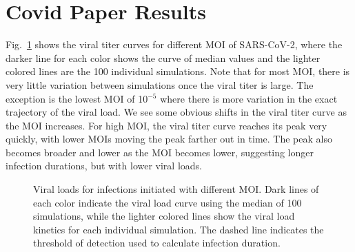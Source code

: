 \section{Covid Paper Results}

Fig.\ \ref{curves} shows the viral titer curves for different MOI of SARS-CoV-2, where the darker line for each color shows the curve of median values and the lighter colored lines are the 100 individual simulations. Note that for most MOI, there is very little variation between simulations once the viral titer is large. The exception is the lowest MOI of 10$^{-5}$ where there is more variation in the exact trajectory of the viral load. We see some obvious shifts in the viral titer curve as the MOI increases. For high MOI, the viral titer curve reaches its peak very quickly, with lower MOIs moving the peak farther out in time. The peak also becomes broader and lower as the MOI becomes lower, suggesting longer infection durations, but with lower viral loads.
\begin{figure}[!h]
\begin{center}
\caption{Viral loads for infections initiated with different MOI. Dark lines of each color indicate the viral load curve using the median of 100 simulations, while the lighter colored lines show the viral load kinetics for each individual simulation. The dashed line indicates the threshold of detection used to calculate infection duration. \label{curves}}
\end{center}
\end{figure}

